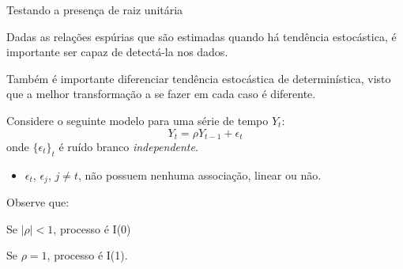 \documentclass[11pt]{beamer}
\newenvironment{wideitemize}{\itemize\addtolength{\itemsep}{10pt}}{\enditemize}
\newenvironment{halfwideitemize}{\itemize\addtolength{\itemsep}{0.5em}}{\enditemize}
\newenvironment{halfwideenumerate}{\enumerate\addtolength{\itemsep}{0.5em}}{\endenumerate}
\begin{document}
\begin{frame}{Testando a presença de raiz unitária}
	\begin{wideitemize}
		\item Dadas as relações espúrias que são estimadas quando há tendência estocástica, é importante ser capaz de detectá-la nos dados.
		\begin{halfwideitemize}
			\item Também é importante diferenciar tendência estocástica de determinística, visto que a melhor transformação a se fazer em cada caso é diferente.
		\end{halfwideitemize}
		\item Considere o seguinte modelo para uma série de tempo $Y_t$:
		\begin{equation}
			\label{eq_rho}
			Y_t = \rho Y_{t-1} + \epsilon_t
		\end{equation}
		onde $\{\epsilon_t\}_t$ é ruído branco \emph{independente}.
		\begin{itemize}
			\item $\epsilon_t$, $\epsilon_{j}$, $j\neq t$, não possuem nenhuma associação, linear ou não.
		\end{itemize}
		\item Observe que:
		\begin{halfwideenumerate}
			\item Se $|\rho| < 1$, processo é I(0)
			\item Se $\rho = 1$, processo é I(1).
		\end{halfwideenumerate}
	\end{wideitemize}
\end{frame}
\end{document}
